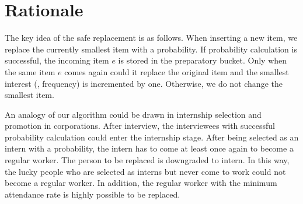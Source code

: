 \presec
\section{Rationale} \postsec
\label{sec:rationale}

The key idea of the safe replacement is as follows. When inserting a new item, we replace the currently smallest item with a probability. If probability calculation is successful, the incoming item $e$ is stored in the preparatory bucket. Only when the same item $e$ comes again could it replace the original item and the smallest interest (\eg, frequency) is incremented by one. Otherwise, we do not change the smallest item. 

An analogy of our algorithm could be drawn in internship selection and promotion in corporations. After interview, the interviewees with successful probability calculation could enter the internship stage. After being selected as an intern with a  probability, the intern has to come at least once again to become a regular worker. The person to be replaced is downgraded to intern. In this way, the lucky people who are selected as interns but never come to work could not become a regular worker. In addition, the regular worker with the minimum attendance rate is highly possible to be replaced. 